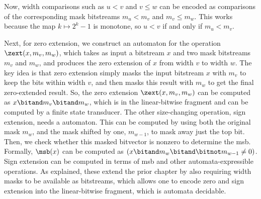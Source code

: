 Now, width comparisons such as $u < v$ and $v \leq w$ can be encoded as comparisons of the corresponding mask bitstreams $m_u < m_v$ and $m_v \leq m_w$.
This works because the map $k \mapsto 2^k - 1$ is monotone, so $u < v$ if and only if $m_u < m_v$.

Next, for zero extension, we construct an automaton for the operation $\zext(x, m_v, m_w)$,
which takes as input a bitstream $x$ and two mask bitstreams $m_v$ and $m_w$,
and produces the zero extension of $x$ from width $v$ to width $w$.
The key idea is that zero extension simply masks the input bitstream $x$ with $m_v$ to keep the bits within width $v$,
and then masks this result with $m_w$ to get the final zero-extended result.
So, the zero extension $\zext(x, m_v, m_w)$ can be computed as $x \bitand m_v \bitand m_w$,
which is in the linear-bitwise fragment and can be computed by a finite state transducer.
The other size-changing operation, sign extension, needs a \msb{} automaton.
This can be computed by using both the original mask $m_w$, and the mask shifted by one, $m_{w-1}$,
to mask away just the top bit. Then, we check whether this masked bitvector is nonzero to determine the msb.
Formally, $\msb(x)$ can be computed as $(x \bitand m_w \bitand \bitnot  m_{w-1} \neq 0)$.
Sign extension can be computed in terms of msb and other automata-expressible operations.
As explained, these extend the prior chapter by also requiring width masks to be available as bitstreams,
which allows one to encode zero and sign extension into the linear-bitwise fragment, which is automata decidable.


